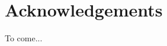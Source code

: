 

\tableofcontents                %


\listoffigures                  %




\chapter{Acknowledgements}      %
To come...


